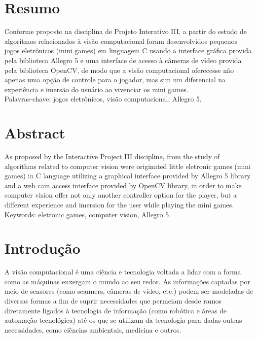 \documentclass[a4paper]{article}
\begin{document}
\section{Resumo}


Conforme proposto na disciplina de Projeto Interativo III, a partir do estudo de algoritmos relacionados à visão computacional foram desenvolvidos pequenos jogos eletrônicos (mini games) em linguagem C usando a interface gráfica provida pela biblioteca Allegro 5 e uma interface de acesso à câmeras de vídeo provida pela biblioteca OpenCV, de modo que a visão computacional oferecesse não apenas uma opção de controle para o jogador, mas sim um diferencial na experiência e imersão do usuário ao vivenciar os mini games.\\

Palavras-chave: jogos eletrônicos, visão computacional, Allegro 5.\\	



\section{Abstract}


As proposed by the Interactive Project III discipline, from the study of algorithms related to computer vision were originated little eletronic games (mini games) in C language utilizing a graphical interface provided by Allegro 5 library and a web cam access interface provided by OpenCV library, in order to make computer vision offer not only another controller option for the player, but a different experience and imersion for the user while playing the mini games.\\

Keywords: eletronic games, computer vision, Allegro 5.\\



\section {Introdução}


A visão computacional é uma ciência e tecnologia voltada a lidar com a forma como as máquinas enxergam o mundo ao seu redor. As informações captadas por meio de sensores (como scanners, câmeras de vídeo, etc.) podem ser modeladas de diversas formas a fim de suprir necessidades que permeiam desde ramos diretamente ligados à tecnologia de informação (como robótica e áreas de automação tecnológica) até os que se utilizam da tecnologia para dadas outras necessidades, como ciências ambientais, medicina e outros.\\
\end{document}
